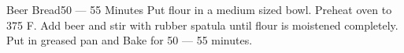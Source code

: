 \documentclass[../cookbook.tex]{subfiles}
\begin{document}
\begin{recipe}{Beer Bread}{}{50 --- 55 Minutes}
    Put flour in a medium sized bowl.
    Preheat oven to 375\degrees{} F. Add beer and stir
    with rubber spatula until flour is moistened
    completely. Put in greased pan and Bake for 50 --- 55
    minutes.
\end{recipe}
\end{document}
